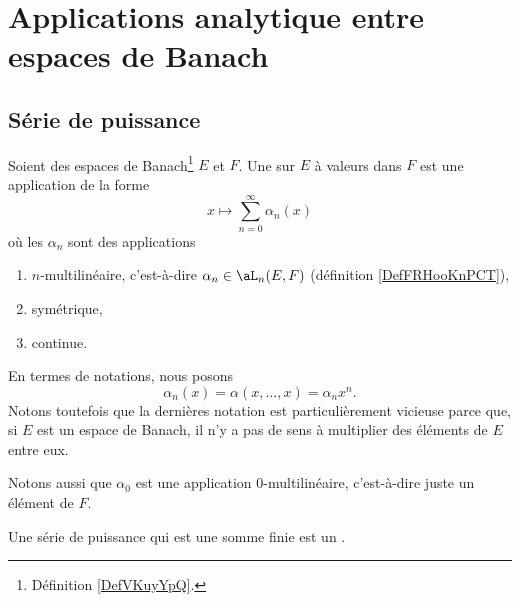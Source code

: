 

\section{Applications analytique entre espaces de Banach}

\subsection{Série de puissance}


\begin{definition}	\label{DEFooIXGBooPgJTzB}
	Soient des espaces de Banach\footnote{Définition \ref{DefVKuyYpQ}.} \( E\) et \( F\).
	Une  sur \( E\) à valeurs dans \( F\) est une application de la forme
	\begin{equation}
		x\mapsto \sum_{n=0}^{\infty}\alpha_n(x)
	\end{equation}
	où les \( \alpha_n\) sont des applications
	\begin{enumerate}
		\item
		      \( n\)-multilinéaire, c'est-à-dire \( \alpha_n\in \aL_n(E,F)\) (définition \ref{DefFRHooKnPCT}),
		\item
		      symétrique,
		\item
		      continue.
	\end{enumerate}
	En termes de notations, nous posons
	\begin{equation}
		\alpha_n(x)=\alpha(x,\ldots,x)=\alpha_nx^n.
	\end{equation}
	Notons toutefois que la dernières notation est particulièrement vicieuse parce que, si \( E\) est un espace de Banach, il n'y a pas de sens à multiplier des éléments de \( E\) entre eux.

	Notons aussi que \( \alpha_0\) est une application \( 0\)-multilinéaire, c'est-à-dire juste un élément de \( F\).
\end{definition}

\begin{definition}	\label{DEFooZUYHooDwwRfp}
	Une série de puissance qui est une somme finie est un .
\end{definition}


